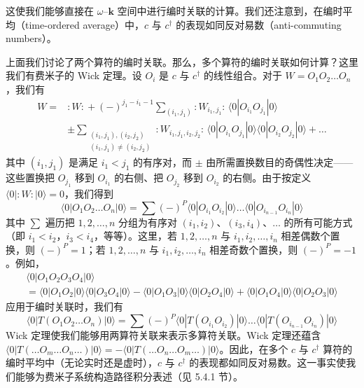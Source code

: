 这使我们能够直接在 $\omega$--$\pmb{k}$ 空间中进行编时关联的计算。我们还注意到，在编时平均（time-ordered average）中，$c$ 与 $c^{\dagger}$ 的表现如同反对易数（anti-commuting numbers）。

上面我们讨论了两个算符的编时关联。那么，多个算符的编时关联如何计算？这里我们有费米子的 Wick 定理。设 $O_{i}$ 是 $c$ 与 $c^{\dagger}$ 的线性组合。对于 $W = O_{1}O_{2}\dots O_{n}$，我们有
\begin{align*}
W = {}& {:W:} + (-)^{j_{1}-i_{1}-1}\sum_{(i_{1},j_{1})}{:W_{i_{1},j_{1}}:}\,\langle 0|O_{i_{1}}O_{j_{1}}|0\rangle\\
& \pm \sum_{\substack{(i_{1},j_{1}),(i_{2},j_{2})\\(i_{1},j_{1})\neq(i_{2},j_{2})}}{:W_{i_{1},j_{1},i_{2},j_{2}}:}\,\langle 0|O_{i_{1}}O_{j_{1}}|0\rangle\langle 0|O_{i_{2}}O_{j_{2}}|0\rangle + \dots \tag{4.2.11}
\end{align*}
其中 $(i_{1}, j_{1})$ 是满足 $i_{1} < j_{1}$ 的有序对，而 $\pm$ 由所需置换数目的奇偶性决定——这些置换把 $O_{j_{1}}$ 移到 $O_{i_{1}}$ 的右侧、把 $O_{j_{2}}$ 移到 $O_{i_{2}}$ 的右侧。由于按定义 $\langle 0|{:W:}|0\rangle = 0$，我们得到
\begin{equation*}
\langle 0|O_{1}O_{2}\dots O_{n}|0\rangle = \sum(-)^{P}\langle 0|O_{i_{1}}O_{i_{2}}|0\rangle\dots\langle 0|O_{i_{n-1}}O_{i_{n}}|0\rangle
\end{equation*}
其中 $\sum$ 遍历把 $1, 2, \dots, n$ 分组为有序对 $(i_{1}, i_{2})$、$(i_{3}, i_{4})$、$\dots$ 的所有可能方式（即 $i_{1} < i_{2}$，$i_{3} < i_{4}$，等等）。这里，若 $1, 2, \dots, n$ 与 $i_{1}, i_{2}, \dots, i_{n}$ 相差偶数个置换，则 $(-)^{P} = 1$；若 $1, 2, \dots, n$ 与 $i_{1}, i_{2}, \dots, i_{n}$ 相差奇数个置换，则 $(-)^{P} = -1$。例如，
\begin{gather*}
\langle 0|O_{1}O_{2}O_{3}O_{4}|0\rangle\\
= \langle 0|O_{1}O_{2}|0\rangle\langle 0|O_{3}O_{4}|0\rangle - \langle 0|O_{1}O_{3}|0\rangle\langle 0|O_{2}O_{4}|0\rangle + \langle 0|O_{1}O_{4}|0\rangle\langle 0|O_{2}O_{3}|0\rangle
\end{gather*}
应用于编时关联时，我们有
\begin{equation*}
\langle 0|T(O_{1}O_{2}\dots O_{n})|0\rangle = \sum(-)^{P}\langle 0|T(O_{i_{1}}O_{i_{2}})|0\rangle\dots\langle 0|T(O_{i_{n-1}}O_{i_{n}})|0\rangle
\end{equation*}
Wick 定理使我们能够用两算符关联来表示多算符关联。Wick 定理还蕴含 $\langle 0|T(\dots O_{m}\dots O_{n}\dots)|0\rangle \allowbreak= -\langle 0|T(\dots O_{n}\dots O_{m}\dots)|0\rangle$。因此，在多个 $c$ 与 $c^{\dagger}$ 算符的编时平均中（无论实时还是虚时），$c$ 与 $c^{\dagger}$ 的表现都如同反对易数。这一事实使我们能够为费米子系统构造路径积分表述（见 5.4.1 节）。

